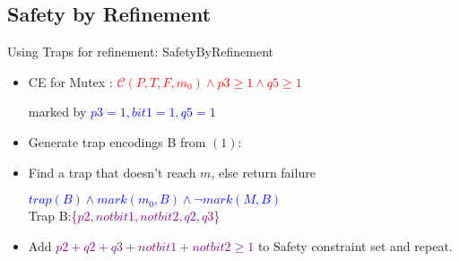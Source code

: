 \documentclass{beamer}
\begin{document}
\subsection{Safety by Refinement}
\begin{frame}{Using Traps for refinement: SafetyByRefinement}
  
  \begin{itemize}
  \item<1-> {
  CE for Mutex : \textcolor{red}{$\mathcal{C}(P,T,F,m_0)\land p3 \geq 1 \land q5 \geq 1 $} 
  \begin{center}
  marked by \textcolor{blue}{$p3=1,bit1=1,q5=1$}
  \end{center}
  }
  \item<2-> {   
Generate trap encodings B from $(1)$:
  }
  \item<3-> {
    Find a trap that doesn't reach $m$, else return failure\\
    \begin{center}
    \textcolor{blue}{$trap(B) \land mark(m_0,B) \land \neg mark(M,B)$}\\
    Trap B:\textcolor{purple}{\{$p2,notbit1,notbit2,q2,q3$\}}
    \end{center}

  }
  \item<5-> { Add \textcolor{purple}{$p2+q2+q3+notbit1+notbit2 \geq 1$} to Safety constraint set and repeat.}
 
  \end{itemize}
\end{frame}
\end{document}
